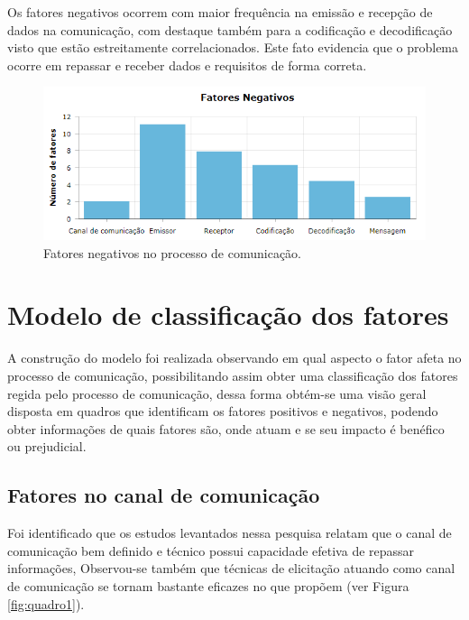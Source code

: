 Os fatores negativos ocorrem com maior frequência na emissão e recepção de dados na comunicação, com destaque também para a codificação e decodificação visto que estão estreitamente correlacionados. Este fato evidencia que o problema ocorre em repassar e receber dados e requisitos de forma correta.  

\begin{figure}[h!] %

	\begin{center}
	    \caption{Fatores negativos no processo de comunicação.}
	    \includegraphics[scale=0.9]{figuras/graftcc1} %
	\end{center}
	\label{fig:graft}
\end{figure}

   
\section{Modelo de classificação dos fatores}

A construção do modelo foi realizada observando em qual aspecto o fator afeta no processo de comunicação, possibilitando assim obter uma classificação dos fatores regida pelo processo de comunicação, dessa forma obtém-se uma visão geral disposta em quadros que identificam os fatores positivos e negativos, podendo obter informações de quais fatores são, onde atuam e se seu impacto é benéfico ou prejudicial. 

\subsection{Fatores no canal de comunicação}

Foi identificado que os estudos levantados nessa pesquisa relatam que o canal de comunicação bem definido e técnico possui capacidade efetiva de repassar informações, Observou-se também que técnicas de elicitação atuando como canal de comunicação se tornam bastante eficazes no que propõem (ver Figura \ref{fig:quadro1}).
 
